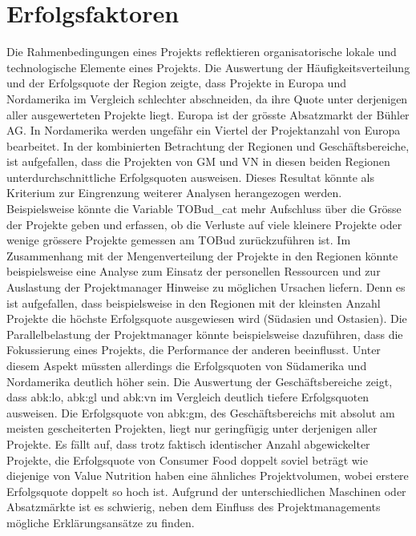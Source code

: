 \section{Erfolgsfaktoren}\label{sec:diskerf}
Die Rahmenbedingungen eines Projekts reflektieren organisatorische lokale und technologische Elemente eines Projekts. Die Auswertung der Häufigkeitsverteilung und der Erfolgsquote der Region zeigte, dass Projekte in Europa und Nordamerika im Vergleich schlechter abschneiden, da ihre Quote unter derjenigen aller ausgewerteten Projekte liegt. Europa ist der grösste Absatzmarkt der Bühler AG. In Nordamerika werden ungefähr ein Viertel der Projektanzahl von Europa bearbeitet. In der kombinierten Betrachtung der Regionen und Geschäftsbereiche, ist aufgefallen, dass die Projekten von GM und VN in diesen beiden Regionen unterdurchschnittliche Erfolgsquoten ausweisen. Dieses Resultat könnte als Kriterium zur Eingrenzung weiterer Analysen herangezogen werden. Beispielsweise könnte die Variable TOBud\_cat mehr Aufschluss über die Grösse der Projekte geben und erfassen, ob die Verluste auf viele kleinere Projekte oder wenige grössere Projekte gemessen am TOBud zurückzuführen ist. Im Zusammenhang mit der Mengenverteilung der Projekte in den Regionen könnte beispielsweise eine Analyse zum Einsatz der personellen Ressourcen und zur Auslastung der Projektmanager Hinweise zu möglichen Ursachen liefern. Denn es ist aufgefallen, dass beispielsweise in den Regionen mit der kleinsten Anzahl Projekte die höchste Erfolgsquote ausgewiesen wird (Südasien und Ostasien). Die Parallelbelastung der Projektmanager könnte beispielsweise dazuführen, dass die Fokussierung eines Projekts, die Performance der anderen beeinflusst. Unter diesem Aspekt müssten allerdings die Erfolgsquoten von Südamerika und Nordamerika deutlich höher sein.
\newline Die Auswertung der Geschäftsbereiche zeigt, dass \gls{abk:lo}, \gls{abk:gl} und \gls{abk:vn} im Vergleich deutlich tiefere Erfolgsquoten ausweisen. Die Erfolgsquote von \gls{abk:gm}, des Geschäftsbereichs mit absolut am meisten gescheiterten Projekten, liegt nur geringfügig unter derjenigen aller Projekte. Es fällt auf, dass trotz faktisch identischer Anzahl abgewickelter Projekte, die Erfolgsquote von Consumer Food doppelt soviel beträgt wie diejenige von Value Nutrition haben eine ähnliches Projektvolumen, wobei erstere Erfolgsquote doppelt so hoch ist. Aufgrund der unterschiedlichen Maschinen oder Absatzmärkte ist es schwierig, neben dem Einfluss des Projektmanagements mögliche Erklärungsansätze zu finden.  %
